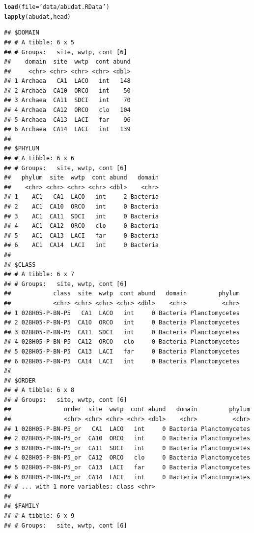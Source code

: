 \documentclass[letterpaper,12pt]{article}\usepackage[]{graphicx}\usepackage[]{color}
\makeatletter
\newcommand{\hlstr}[1]{\textcolor[rgb]{0.192,0.494,0.8}{#1}}%
\newcommand{\hlstd}[1]{\textcolor[rgb]{0.345,0.345,0.345}{#1}}%
\newcommand{\hlkwc}[1]{\textcolor[rgb]{0.333,0.667,0.333}{#1}}%
\newcommand{\hlkwd}[1]{\textcolor[rgb]{0.737,0.353,0.396}{\textbf{#1}}}%
\newenvironment{kframe}{%
 \def\at@end@of@kframe{}%
 \ifinner\ifhmode%
  \def\at@end@of@kframe{\end{minipage}}%
  \begin{minipage}{\columnwidth}%
 \fi\fi%
 \def\FrameCommand##1{\hskip\@totalleftmargin \hskip-\fboxsep
 \colorbox{shadecolor}{##1}\hskip-\fboxsep
     \hskip-\linewidth \hskip-\@totalleftmargin \hskip\columnwidth}%
 \MakeFramed {\advance\hsize-\width
   \@totalleftmargin\z@ \linewidth\hsize
   \@setminipage}}%
 {\par\unskip\endMakeFramed%
 \at@end@of@kframe}
\newenvironment{knitrout}{}{} %
\makeatother
\begin{document}
\begin{knitrout}
\color{fgcolor}\begin{kframe}
\begin{alltt}
\hlkwd{load}\hlstd{(}\hlkwc{file} \hlstd{=} \hlstr{'data/abudat.RData'}\hlstd{)}
\hlkwd{lapply}\hlstd{(abudat, head)}
\end{alltt}
\begin{verbatim}
## $DOMAIN
## # A tibble: 6 x 5
## # Groups:   site, wwtp, cont [6]
##    domain  site  wwtp  cont abund
##     <chr> <chr> <chr> <chr> <dbl>
## 1 Archaea   CA1  LACO   int   148
## 2 Archaea  CA10  ORCO   int    50
## 3 Archaea  CA11  SDCI   int    70
## 4 Archaea  CA12  ORCO   clo   104
## 5 Archaea  CA13  LACI   far    96
## 6 Archaea  CA14  LACI   int   139
## 
## $PHYLUM
## # A tibble: 6 x 6
## # Groups:   site, wwtp, cont [6]
##   phylum  site  wwtp  cont abund   domain
##    <chr> <chr> <chr> <chr> <dbl>    <chr>
## 1    AC1   CA1  LACO   int     2 Bacteria
## 2    AC1  CA10  ORCO   int     0 Bacteria
## 3    AC1  CA11  SDCI   int     0 Bacteria
## 4    AC1  CA12  ORCO   clo     0 Bacteria
## 5    AC1  CA13  LACI   far     0 Bacteria
## 6    AC1  CA14  LACI   int     0 Bacteria
## 
## $CLASS
## # A tibble: 6 x 7
## # Groups:   site, wwtp, cont [6]
##            class  site  wwtp  cont abund   domain         phylum
##            <chr> <chr> <chr> <chr> <dbl>    <chr>          <chr>
## 1 028H05-P-BN-P5   CA1  LACO   int     0 Bacteria Planctomycetes
## 2 028H05-P-BN-P5  CA10  ORCO   int     0 Bacteria Planctomycetes
## 3 028H05-P-BN-P5  CA11  SDCI   int     0 Bacteria Planctomycetes
## 4 028H05-P-BN-P5  CA12  ORCO   clo     0 Bacteria Planctomycetes
## 5 028H05-P-BN-P5  CA13  LACI   far     0 Bacteria Planctomycetes
## 6 028H05-P-BN-P5  CA14  LACI   int     0 Bacteria Planctomycetes
## 
## $ORDER
## # A tibble: 6 x 8
## # Groups:   site, wwtp, cont [6]
##               order  site  wwtp  cont abund   domain         phylum
##               <chr> <chr> <chr> <chr> <dbl>    <chr>          <chr>
## 1 028H05-P-BN-P5_or   CA1  LACO   int     0 Bacteria Planctomycetes
## 2 028H05-P-BN-P5_or  CA10  ORCO   int     0 Bacteria Planctomycetes
## 3 028H05-P-BN-P5_or  CA11  SDCI   int     0 Bacteria Planctomycetes
## 4 028H05-P-BN-P5_or  CA12  ORCO   clo     0 Bacteria Planctomycetes
## 5 028H05-P-BN-P5_or  CA13  LACI   far     0 Bacteria Planctomycetes
## 6 028H05-P-BN-P5_or  CA14  LACI   int     0 Bacteria Planctomycetes
## # ... with 1 more variables: class <chr>
## 
## $FAMILY
## # A tibble: 6 x 9
## # Groups:   site, wwtp, cont [6]

\end{verbatim}
\end{kframe}
\end{knitrout}
\end{document}
